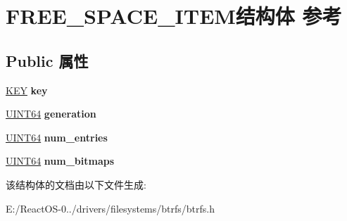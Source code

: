 \hypertarget{struct_f_r_e_e___s_p_a_c_e___i_t_e_m}{}\section{F\+R\+E\+E\+\_\+\+S\+P\+A\+C\+E\+\_\+\+I\+T\+E\+M结构体 参考}
\label{struct_f_r_e_e___s_p_a_c_e___i_t_e_m}
\subsection*{Public 属性}
\begin{DoxyCompactItemize}
\item 
\mbox{\label{struct_f_r_e_e___s_p_a_c_e___i_t_e_m_a4f4292a5e712190c34db27eccb591ced}} 
\hyperlink{struct_k_e_y}{K\+EY} {\bfseries key}
\item 
\mbox{\label{struct_f_r_e_e___s_p_a_c_e___i_t_e_m_a31f496490ef2c0401cd1edfe5e354cb3}} 
\hyperlink{_processor_bind_8h_a57be03562867144161c1bfee95ca8f7c}{U\+I\+N\+T64} {\bfseries generation}
\item 
\mbox{\label{struct_f_r_e_e___s_p_a_c_e___i_t_e_m_a1f879ceed1b8e167b3f5874189e0ffa4}} 
\hyperlink{_processor_bind_8h_a57be03562867144161c1bfee95ca8f7c}{U\+I\+N\+T64} {\bfseries num\+\_\+entries}
\item 
\mbox{\label{struct_f_r_e_e___s_p_a_c_e___i_t_e_m_af8b41c30a4f983a81eb04ed7f73d5ddd}} 
\hyperlink{_processor_bind_8h_a57be03562867144161c1bfee95ca8f7c}{U\+I\+N\+T64} {\bfseries num\+\_\+bitmaps}
\end{DoxyCompactItemize}


该结构体的文档由以下文件生成\+:\begin{DoxyCompactItemize}
\item 
E\+:/\+React\+O\+S-\/0../drivers/filesystems/btrfs/btrfs.\+h\end{DoxyCompactItemize}
